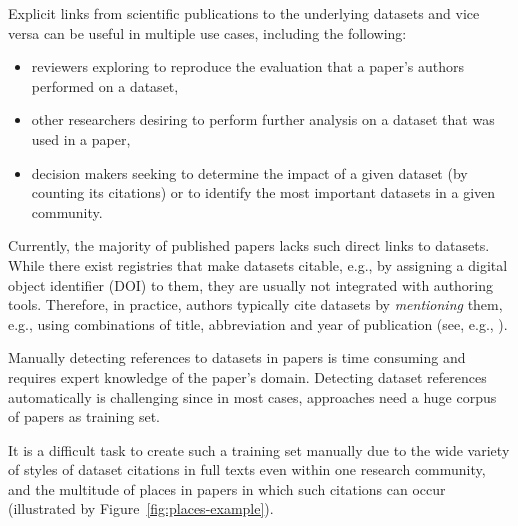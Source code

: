 \documentclass{IOS-Book-Article}
\begin{document}
Explicit links from scientific publications to the underlying datasets and vice versa can be useful in multiple use cases, including the following:
\begin{itemize}
	\item reviewers exploring to reproduce the evaluation that a paper's authors performed on a dataset, 
	\item other researchers desiring to perform further analysis on a dataset that was used in a paper,
        \item decision makers seeking to determine the impact of a given dataset (by counting its citations) or to identify the most important datasets in a given community.
\end{itemize}%

Currently, the majority of published papers lacks such direct links to datasets.
While there exist registries that make datasets citable, e.g., by assigning a digital object identifier (DOI) to them, they are usually not integrated with authoring tools.
Therefore, in practice, authors typically cite datasets by \emph{mentioning} them, e.g., using  
combinations of title, abbreviation and year of publication (see, e.g., \citet{Mathiak2015}).  

Manually detecting references to datasets in papers is time consuming and requires expert knowledge of the paper's domain. 
Detecting dataset references automatically is challenging since in most cases, approaches need a huge corpus of papers as training set. 

It is a difficult task to create such a training set manually due to the wide variety of styles of dataset citations in full texts even within one research community, and the multitude of places in papers in which such citations can occur (illustrated by Figure~\ref{fig:places-example}).
\end{document}
